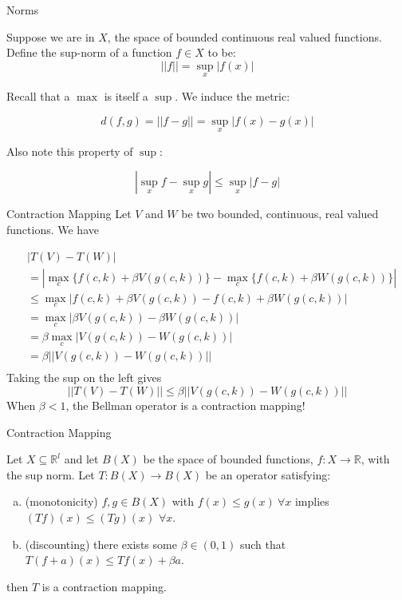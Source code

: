 \documentclass[11pt, xcolor={dvipsnames}, hyperref={colorlinks, allcolors=Blue}]{beamer}
\newcommand{\R}{\mathbb{R}}
\begin{document}
\begin{frame}{Norms}

Suppose we are in $X$, the space of bounded continuous real valued functions. Define the sup-norm of a function $f \in X$ to be:
\[ ||f|| = \underset{x}{\sup} |f(x)|\] 

Recall that a $\max$ is itself a $\sup$. We induce the metric:

\[d(f, g) = ||f - g|| = \underset{x}{\sup} | f(x) - g(x)|\]
\bigskip

Also note this property of $\sup$:

\[| \sup_{x} f - \sup_{x} g| \leq \sup_{x} | f - g|\]

\end{frame}

\begin{frame}{Contraction Mapping}
Let $V$ and $W$ be two bounded, continuous, real valued functions. We have

\begin{align*}
& |T(V) - T(W)|\\
 &= | \max_{c}\{f(c,k) + \beta V(g(c,k))\} -  \max_{c}\{f(c,k) + \beta W(g(c,k))\} | \\
& \leq \max_{c} | f(c,k) + \beta V(g(c,k)) -  f(c,k) + \beta W(g(c,k)) |\\
& = \max_{c} | \beta V(g(c,k)) -  \beta W(g(c,k)) |\\
& = \beta \max_{c} | V(g(c,k)) -  W(g(c,k)) |\\
& = \beta ||V(g(c,k)) -  W(g(c,k)) ||\\
\end{align*}
Taking the sup on the left gives 
\[ ||T(V) - T(W)|| \leq  \beta ||V(g(c,k)) -  W(g(c,k)) ||\]
When  $\beta < 1$, the Bellman operator is a contraction mapping!
\end{frame}

\begin{frame}{Contraction Mapping}
\begin{theorem}
Let $X\subseteq \R^{l}$ and let $B(X)$ be the space of bounded functions, $f:X \to \R$, with the sup norm. Let $T:B(X)\to B(X)$ be an operator satisfying:
	\begin{enumerate}[a)]
		\item (monotonicity) $f, g\in B(X)$ with $f(x) \leq g(x) \ \forall x$ implies $(Tf)(x) \leq (Tg)(x)$ $\forall x$.
		\item (discounting) there exists some $\beta\in(0,1)$ such that $T(f + a)(x) \leq Tf(x) + \beta a$.
	\end{enumerate}
then $T$ is a contraction mapping.
\end{theorem}
\vfill\vfill
\end{frame}
\end{document}
